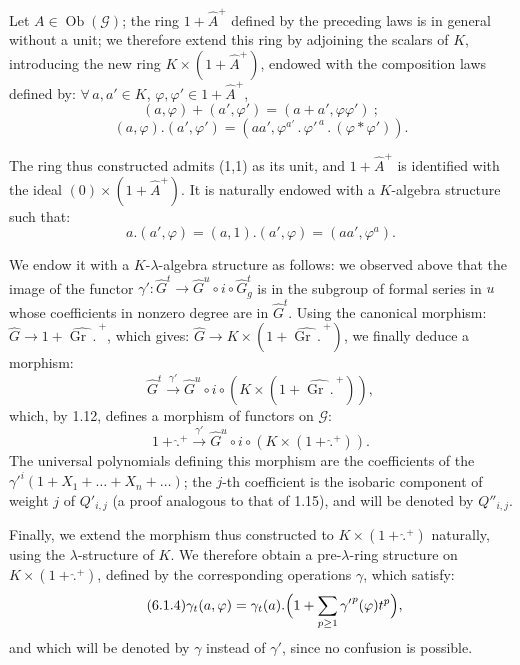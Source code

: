 Let \(A\in\operatorname{Ob}(\mathcal G)\); the ring \(1+\widehat A^{+}\) defined by the preceding laws is in general without a unit; we therefore extend this ring by adjoining the scalars of \(K\), introducing the new ring \(K\times(1+\widehat A^{+})\), endowed with the composition laws defined by: \(\forall\,a,a'\in K\), \(\varphi,\varphi'\in1+\widehat A^{+}\),
\[
  (a,\varphi)+(a',\varphi')=(a+a',\varphi\varphi')~;
\]
\begin{equation}\tag{6.1.2}
  (a,\varphi).(a',\varphi')=(aa',\varphi^{a'}\mathbin{.}{\varphi'}^{\,a}\mathbin{.}(\varphi\ast\varphi')).
\end{equation}

The ring thus constructed admits (1,1) as its unit, and \(1+\widehat A^{+}\) is identified with the ideal \((0)\times(1+\widehat A^{+})\). It is naturally endowed with a \(K\)-algebra structure such that:
\begin{equation}\tag{6.1.3}
  a.(a',\varphi)=(a,1).(a',\varphi)=(aa',\varphi^{a}).
\end{equation}

%
We endow it with a \(K\)-\(\lambda\)-algebra structure as follows: we observed above that the image of the functor \(\gamma'\colon\widehat G^t\longrightarrow\widehat G^u\circ i\circ\widehat G^t_g\) is in the subgroup of formal series in \(u\) whose coefficients in nonzero degree are in \(\widehat G^t\). Using the canonical morphism: \(\widehat G\longrightarrow 1+\widehat{\operatorname{Gr}\,\mathord{.}\,}^{+}\), which gives: \(\widehat G\longrightarrow K\times(1+\widehat{\operatorname{Gr}\,\mathord{.}\,}^{+})\), we finally deduce a morphism:
\[
  \widehat G^t\xrightarrow{\gamma'}\widehat G^u\circ i\circ(K\times(1+\widehat{\operatorname{Gr}\,\mathord{.}\,}^{+})),
\]
which, by 1.12, defines a morphism of functors on \(\mathcal G\):
\[
  1+\widehat{\mathord{.}}{}^{+}\xrightarrow{\gamma'}\widehat G^u\circ i\circ(K\times(1+\widehat{\mathord{.}}{}^{+})).
\]
The universal polynomials defining this morphism are the coefficients of the \({\gamma'}^{i}(1+X_1+\ldots+X_n+\ldots)\); the \(j\)-th coefficient is the isobaric component of weight \(j\) of \(Q'_{i,j}\) (a proof analogous to that of 1.15), and will be denoted by \(Q''_{i,j}\).

Finally, we extend the morphism thus constructed to \(K\times(1+\widehat{\mathord{.}}{}^{+})\) naturally, using the \(\lambda\)-structure of \(K\). We therefore obtain a pre-\(\lambda\)-ring structure on \(K\times(1+\widehat{\mathord{.}}{}^{+})\), defined by the corresponding operations \(\gamma\), which satisfy:
\begin{equation}\tag{6.1.4}
  \gamma_t(a,\varphi)=\gamma_t(a).\Bigl(1+\sum_{p\ge1}{\gamma'}^{p}(\varphi)t^{p}\Bigr),
\end{equation}
and which will be denoted by \(\gamma\) instead of \(\gamma'\), since no confusion is possible.

